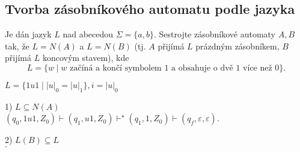 \subsection{Tvorba zásobníkového automatu podle jazyka}
Je dán jazyk $L$ nad abecedou $\Sigma = \{a,b\}$. Sestrojte zásobníkové automaty $A,B$ tak, že $L = N(A)$ a $L = N(B)$ 
(tj. $A$ přijímá $L$ prázdným zásobníkem, $B$ přijímá $L$ koncovým stavem), kde
\[L = \{w \mid w \text{ začíná a končí symbolem } 1 \text{ a obsahuje o dvě } 1 \text{ více než } 0\}\text{.}\]
\begin{multicols}{2}
    $L = \{1u1 \mid |u|_0 = |u|_1\}, i = |u|_0$


    \columnbreak

    1) $L \subseteq N(A)$\\
    $(q_0, 1u1, Z_0) \vdash (q_1, u1, Z_0) \vdash^\star (q_1, 1, Z_0) \vdash (q_f, \varepsilon, \varepsilon)$.

    2) $L(B) \subseteq L$\\

    $.$

\end{multicols}

